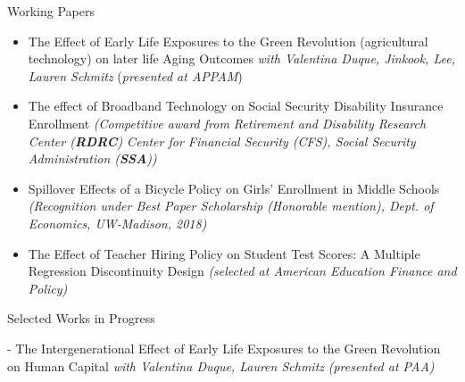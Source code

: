 \documentclass{resume} %
\begin{document}
\begin{rSection}{Working Papers}
\begin{itemize}
\item The Effect of Early Life Exposures to the Green Revolution (agricultural technology) on later life Aging Outcomes \textit{with Valentina Duque, Jinkook, Lee, Lauren Schmitz} (\textit{\scriptsize{presented at APPAM}}) 

\item The effect of Broadband Technology on Social Security Disability Insurance Enrollment \textit{\scriptsize{(Competitive award from Retirement and Disability Research Center (\textbf{RDRC}) Center for Financial Security (CFS), Social Security Administration (\textbf{SSA}))}}

\item Spillover Effects of a Bicycle Policy on Girls' Enrollment in Middle Schools \textit{\scriptsize{(Recognition under Best Paper Scholarship (Honorable mention), Dept. of Economics, UW-Madison, 2018) }}

\item The Effect of Teacher Hiring Policy on Student Test Scores: A Multiple Regression Discontinuity Design \textit{\scriptsize{(selected at American Education Finance and Policy)}} \\
\end{itemize}





\end{rSection}


\begin{rSection}{Selected Works in Progress}


- The Intergenerational Effect of Early Life Exposures to the Green Revolution on Human Capital \textit{with Valentina Duque, Lauren Schmitz} \textit{\scriptsize{(presented at PAA})} \\ \\

\end{rSection}


\end{document}
